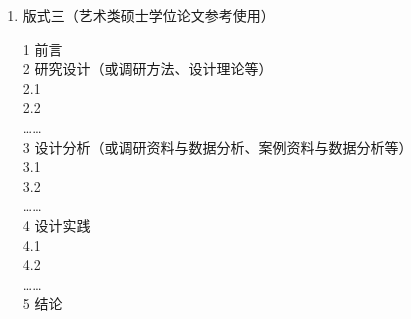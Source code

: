 \begin{enumerate}
      \item 版式三（艺术类硕士学位论文参考使用）
      \begin{tcolorbox}[breakable]{
        1 前言\\
        2 研究设计（或调研方法、设计理论等）\\
        2.1\\
        2.2\\
        ……\\
        3 设计分析（或调研资料与数据分析、案例资料与数据分析等）\\
        3.1\\
        3.2\\
        ……\\
        4 设计实践\\
        4.1\\
        4.2\\
        ……\\
        5 结论
      }\end{tcolorbox}
  \end{enumerate}

    
